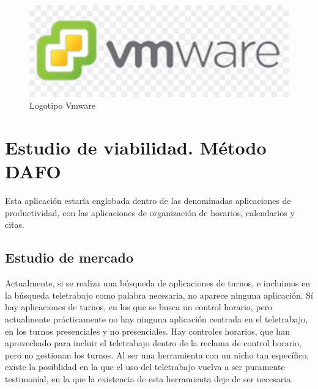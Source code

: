 \documentclass[11pt,spanish,listoffigures,listoftables]{tfgetsinf}
\begin{document}
\begin{figure}[!htb]
   \endminipage\hfill
     \includegraphics[width=\linewidth]{img/logo-vmware.jpg}
     \caption{Logotipo Vmware}\label{fig:LogoVmware}
   \endminipage
\end{figure}




\chapter{Estudio de viabilidad. Método DAFO}

Esta aplicación estaría englobada dentro de las denominadas aplicaciones de productividad, con las aplicaciones de organización de horarios, calendarios y citas.

\section{Estudio de mercado}

Actualmente, si se realiza una búsqueda de aplicaciones de turnos, e incluimos en la búsqueda teletrabajo como palabra necesaria, no aparece ninguna aplicación. 
Sí hay aplicaciones de turnos, en los que se busca un control horario, pero actualmente prácticamente no hay ninguna aplicación centrada en el teletrabajo, en los turnos presenciales y no presenciales.
Hay controles horarios, que han aprovechado para incluir el teletrabajo dentro de la reclama de control horario, pero no gestionan los turnos.
Al ser una herramienta con un nicho tan específico, existe la posiblidad en la que el uso del teletrabajo vuelva a ser puramente testimonial, en la que la existencia de esta herramienta deje de ser necesaria.
\end{document}
